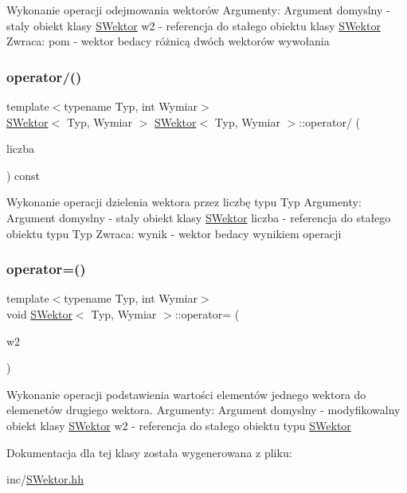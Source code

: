 Wykonanie operacji odejmowania wektorów Argumenty\+: Argument domyslny -\/ staly obiekt klasy \hyperlink{classSWektor}{S\+Wektor} w2 -\/ referencja do stałego obiektu klasy \hyperlink{classSWektor}{S\+Wektor} Zwraca\+: pom -\/ wektor bedacy różnicą dwóch wektorów wywołania \mbox{\label{classSWektor_a80fde5a5dca1d5b261bda6c4da826134}} 
\subsubsection{\texorpdfstring{operator/()}{operator/()}}
{\footnotesize\ttfamily template$<$typename Typ, int Wymiar$>$ \\
\hyperlink{classSWektor}{S\+Wektor}$<$ Typ, Wymiar $>$ \hyperlink{classSWektor}{S\+Wektor}$<$ Typ, Wymiar $>$\+::operator/ (\begin{DoxyParamCaption}\item[{Typ}]{liczba }\end{DoxyParamCaption}) const}

Wykonanie operacji dzielenia wektora przez liczbę typu Typ Argumenty\+: Argument domyslny -\/ staly obiekt klasy \hyperlink{classSWektor}{S\+Wektor} liczba -\/ referencja do stałego obiektu typu Typ Zwraca\+: wynik -\/ wektor bedacy wynikiem operacji \mbox{\label{classSWektor_a03255e5b60c400972aad2a56f06832c4}} 
\subsubsection{\texorpdfstring{operator=()}{operator=()}}
{\footnotesize\ttfamily template$<$typename Typ, int Wymiar$>$ \\
void \hyperlink{classSWektor}{S\+Wektor}$<$ Typ, Wymiar $>$\+::operator= (\begin{DoxyParamCaption}\item[{const \hyperlink{classSWektor}{S\+Wektor}$<$ Typ, Wymiar $>$ \&}]{w2 }\end{DoxyParamCaption})}

Wykonanie operacji podstawienia wartości elementów jednego wektora do elemenetów drugiego wektora. Argumenty\+: Argument domyslny -\/ modyfikowalny obiekt klasy \hyperlink{classSWektor}{S\+Wektor} w2 -\/ referencja do stałego obiektu typu \hyperlink{classSWektor}{S\+Wektor} 

Dokumentacja dla tej klasy została wygenerowana z pliku\+:\begin{DoxyCompactItemize}
\item 
inc/\hyperlink{SWektor_8hh}{S\+Wektor.\+hh}\end{DoxyCompactItemize}
